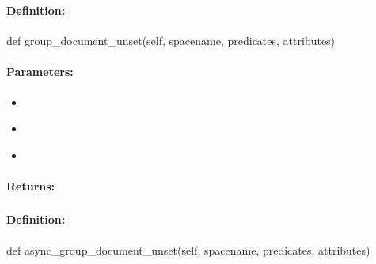 \pagebreak
\subsubsection{}
\label{api:python:group_document_unset}


\paragraph{Definition:}
\begin{pythoncode}
def group_document_unset(self, spacename, predicates, attributes)
\end{pythoncode}

\paragraph{Parameters:}
\begin{itemize}[noitemsep]
\item {}\\

\item {}\\

\item {}\\

\end{itemize}

\paragraph{Returns:}


\pagebreak
\subsubsection{}
\label{api:python:async_group_document_unset}


\paragraph{Definition:}
\begin{pythoncode}
def async_group_document_unset(self, spacename, predicates, attributes)
\end{pythoncode}

